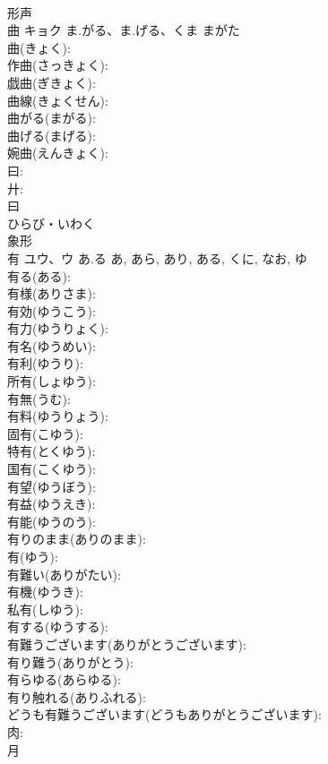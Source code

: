 \documentclass[8pt]{extreport}
\begin{document}
\begin{CJK}{UTF8}{min}
\\	形声 
\\	曲	キョク	ま.がる、ま.げる、くま	まがた	
\\	曲(きょく): 
\\	作曲(さっきょく): 
\\	戯曲(ぎきょく): 
\\	曲線(きょくせん): 
\\	曲がる(まがる): 
\\	曲げる(まげる): 
\\	婉曲(えんきょく): 
\\	曰: 
\\	廾: 
\\	曰	
\\	ひらび・いわく	
\\	象形 
\\	有	ユウ、ウ	あ.る	あ, あら, あり, ある, くに, なお, ゆ	
\\	有る(ある): 
\\	有様(ありさま): 
\\	有効(ゆうこう): 
\\	有力(ゆうりょく): 
\\	有名(ゆうめい): 
\\	有利(ゆうり): 
\\	所有(しょゆう): 
\\	有無(うむ): 
\\	有料(ゆうりょう): 
\\	固有(こゆう): 
\\	特有(とくゆう): 
\\	国有(こくゆう): 
\\	有望(ゆうぼう): 
\\	有益(ゆうえき): 
\\	有能(ゆうのう): 
\\	有りのまま(ありのまま): 
\\	有(ゆう): 
\\	有難い(ありがたい): 
\\	有機(ゆうき): 
\\	私有(しゆう): 
\\	有する(ゆうする): 
\\	有難うございます(ありがとうございます): 
\\	有り難う(ありがとう): 
\\	有らゆる(あらゆる): 
\\	有り触れる(ありふれる): 
\\	どうも有難うございます(どうもありがとうございます): 
\\	肉: 
\\	月	

\end{CJK}
\end{document}

